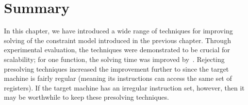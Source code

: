\section{Summary}

In this chapter, we have introduced a wide range of techniques for improving
solving of the \gls{constraint model} introduced in the previous chapter.
%
Through experimental evaluation, the techniques were demonstrated to be crucial
for scalability; for one \gls{function}, the solving time was improved
by~\printMaxZCNorm{%
  \SolvTechEnableOnlyAllGoodPrePlusSolvingTimeSpeedupPrePlusSolvingTimeZeroCenteredSpeedupMax,
  \SolvTechDisableAllPrePlusSolvingTimeSpeedupPrePlusSolvingTimeZeroCenteredSpeedupMax
}.
%
Rejecting \gls{presolving} techniques  increased the improvement further to \printZCNorm{%
  \SolvTechDisableAllBadPrePlusSolvingTimeSpeedupPrePlusSolvingTimeZeroCenteredSpeedupMax%
} since the \gls{target machine} is fairly regular (meaning its
\glspl{instruction} can access the same set of \glspl{register}).
%
If the \gls{target machine} has an irregular \gls{instruction set}, however,
then it may be worthwhile to keep these \gls{presolving} techniques.
